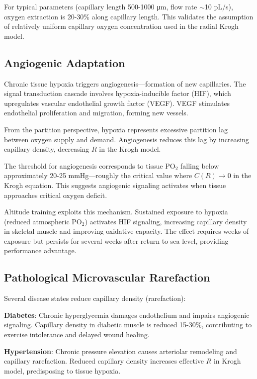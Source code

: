 \documentclass[12pt,a4paper]{article}
\theoremstyle{remark}
\begin{document}
For typical parameters (capillary length 500-1000 μm, flow rate $\sim$10 pL/s), oxygen extraction is 20-30\% along capillary length. This validates the assumption of relatively uniform capillary oxygen concentration used in the radial Krogh model.

\subsection{Angiogenic Adaptation}

Chronic tissue hypoxia triggers angiogenesis—formation of new capillaries. The signal transduction cascade involves hypoxia-inducible factor (HIF), which upregulates vascular endothelial growth factor (VEGF). VEGF stimulates endothelial proliferation and migration, forming new vessels.

From the partition perspective, hypoxia represents excessive partition lag between oxygen supply and demand. Angiogenesis reduces this lag by increasing capillary density, decreasing $R$ in the Krogh model.

The threshold for angiogenesis corresponds to tissue PO$_{2}$ falling below approximately 20-25 mmHg—roughly the critical value where $C(R) \to 0$ in the Krogh equation. This suggests angiogenic signaling activates when tissue approaches critical oxygen deficit.

Altitude training exploits this mechanism. Sustained exposure to hypoxia (reduced atmospheric PO$_{2}$) activates HIF signaling, increasing capillary density in skeletal muscle and improving oxidative capacity. The effect requires weeks of exposure but persists for several weeks after return to sea level, providing performance advantage.

\subsection{Pathological Microvascular Rarefaction}

Several disease states reduce capillary density (rarefaction):

\textbf{Diabetes}: Chronic hyperglycemia damages endothelium and impairs angiogenic signaling. Capillary density in diabetic muscle is reduced 15-30\%, contributing to exercise intolerance and delayed wound healing.

\textbf{Hypertension}: Chronic pressure elevation causes arteriolar remodeling and capillary rarefaction. Reduced capillary density increases effective $R$ in Krogh model, predisposing to tissue hypoxia.
\end{document}
